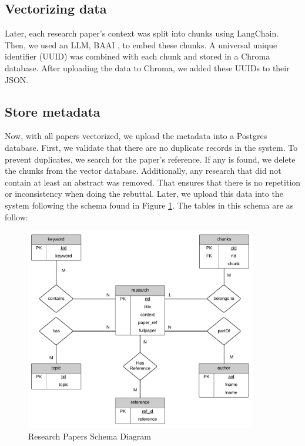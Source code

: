 \subsection{Vectorizing data}
Later, each research paper’s context was split into chunks using LangChain. Then, we used an LLM, BAAI \cite{bge_embedding}, to embed these chunks. A universal unique identifier (UUID) was combined with each chunk and stored in a Chroma \cite{chroma} database. After uploading the data to Chroma, we added these UUIDs to their JSON. 


\subsection{Store metadata}
Now, with all papers vectorized, we upload the metadata into a Postgres database. First, we validate that there are no duplicate records in the system. To prevent duplicates, we search for the paper's reference. If any is found, we delete the chunks from the vector database. Additionally, any research that did not contain at least an abstract was removed. That ensures that there is no repetition or inconsistency when doing the rebuttal. Later, we upload this data into the system following the schema found in Figure \ref{fig:table}. The tables in this schema are as follow:

\begin{figure}[!ht]
	\begin{center}
		\includegraphics[width=0.9\textwidth]{images/Table_diagram.png} %
	\end{center}
	\caption{Research Papers Schema Diagram} %
	\label{fig:table}
\end{figure}


